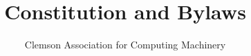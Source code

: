 \documentclass{article}
\begin{document}
\title{Constitution and Bylaws}
\author{Clemson Association for Computing Machinery}
\date{}
\maketitle
\newpage

\tableofcontents
\newpage














\end{document}
